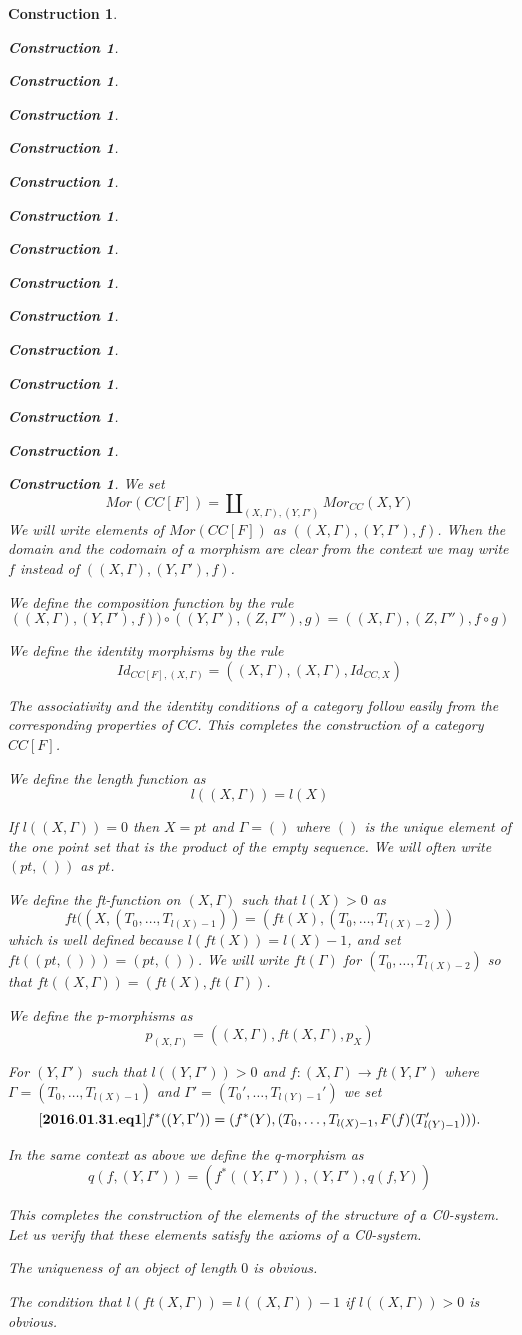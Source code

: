 \documentclass[12pt]{amsart}
\newenvironment{eq}{\begin{equation}}{\end{equation}}
\newtheorem{construction}[proposition]{Construction}
\newcommand{\llabel}[1]{\label{#1}[{\bf #1}]}
\newcommand{\sr}{\rightarrow}
\begin{document}
\begin{construction}
\begin{construction}
\begin{construction}
\begin{construction}
\begin{construction}
\begin{construction}
\begin{construction}
\begin{construction}
\begin{construction}
\begin{construction}
\begin{construction}
\begin{construction}
\begin{construction}
\begin{construction}
\begin{construction}
We set
%
$$Mor(CC[F])=\amalg_{(X,\Gamma),(Y,\Gamma')}Mor_{CC}(X,Y)$$
%
We will write elements of $Mor(CC[F])$ as $((X,\Gamma),(Y,\Gamma'),f)$. When the domain and the codomain of a morphism are clear from the context we may write $f$ instead of $((X,\Gamma),(Y,\Gamma'),f)$. 

We define the composition function by the rule
%
$$((X,\Gamma),(Y,\Gamma'),f))\circ ((Y,\Gamma'),(Z,\Gamma''),g)=((X,\Gamma),(Z,\Gamma''),f\circ g)$$

We define the identity morphisms by the rule
%
$$Id_{CC[F],(X,\Gamma)}=((X,\Gamma),(X,\Gamma),Id_{CC,X})$$
%

The associativity and the identity conditions of a category follow easily from the corresponding properties of  $CC$. This completes the construction of a category  $CC[F]$. 

We define the length function as
%
$$l((X,\Gamma))=l(X)$$

If $l((X,\Gamma))=0$ then $X=pt$ and $\Gamma=()$ where $()$ is the unique element of the one point set that is the product of the empty sequence. We will often write $(pt,())$ as $pt$. 

We define the ft-function on $(X,\Gamma)$ such that $l(X)>0$ as 
%
$$ft((X,(T_0,\dots,T_{l(X)-1}))=(ft(X),(T_0,\dots,T_{l(X)-2}))$$
%
which is well defined because $l(ft(X))=l(X)-1$, and set $ft((pt,()))=(pt,())$. We will write $ft(\Gamma)$ for $(T_0,\dots,T_{l(X)-2})$ so that $ft((X,\Gamma))=(ft(X),ft(\Gamma))$. 

We define the p-morphisms as 
%
$$p_{(X,\Gamma)}=((X,\Gamma),ft(X,\Gamma), p_X)$$

For $(Y,\Gamma')$ such that $l((Y,\Gamma'))>0$ and $f:(X,\Gamma)\sr ft(Y,\Gamma')$ where $\Gamma=(T_0,\dots,T_{l(X)-1})$ and $\Gamma'=(T_0',\dots,T_{l(Y)-1}')$ we set
%
\begin{eq}\llabel{2016.01.31.eq1}
f^*((Y,\Gamma'))=(f^*(Y),(T_0,\dots,T_{l(X)-1},F(f)(T'_{l(Y)-1}))).
\end{eq}
%

In the same context as above we define the q-morphism as
%
$$q(f,(Y,\Gamma'))=(f^*((Y,\Gamma')),(Y,\Gamma'),q(f,Y))$$

This completes the construction of the elements of the structure of a C0-system. Let us verify that these elements satisfy the axioms of a C0-system. 

The uniqueness of an object of length $0$ is obvious.

The condition that $l(ft(X,\Gamma))=l((X,\Gamma))-1$ if $l((X,\Gamma))>0$ is obvious.


\end{construction}
\end{construction}
\end{construction}
\end{construction}
\end{construction}
\end{construction}
\end{construction}
\end{construction}
\end{construction}
\end{construction}
\end{construction}
\end{construction}
\end{construction}
\end{construction}
\end{construction}
\end{document}
